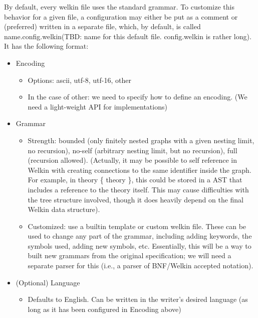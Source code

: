 By default, every welkin file uses the standard grammar. To customize this behavior for a given file, a configuration may either be put as a comment or (preferred) written in a separate file, which, by default, is called name.config.welkin(TBD: name for this default file. config.welkin is rather long). It has the following format:
\begin{itemize}
	\item Encoding
				\begin{itemize}
					\item Options: ascii, utf-8, utf-16, other
					\item In the case of other: we need to specify how to define an encoding. (We need a light-weight API for implementations)
				\end{itemize}
	\item Grammar
				\begin{itemize}
					\item Strength: bounded (only finitely nested graphs with a given nesting limit, no recursion), no-self (arbitrary nesting limit, but no recursion), full (recursion allowed). (Actually, it may be possible to self reference in Welkin with creating connections to the same identifier inside the graph. For example, in theory \{ theory \}, this could be stored in a AST that includes a reference to the theory itself. This may cause difficulties with the tree structure involved, though it does heavily depend on the final Welkin data structure).

					\item Customized: use a builtin template or custom welkin file. These can be used to change any part of the grammar, including adding keywords, the symbols used, adding new symbols, etc. Essentially, this will be a way to built new grammars from the original specification; we will need a separate parser for this (i.e., a parser of BNF/Welkin accepted notation).
				\end{itemize}

	\item (Optional) Language
				\begin{itemize}
					\item Defaults to English. Can be written in the writer's desired language (as long as it has been configured in Encoding above)
				\end{itemize}
\end{itemize}

